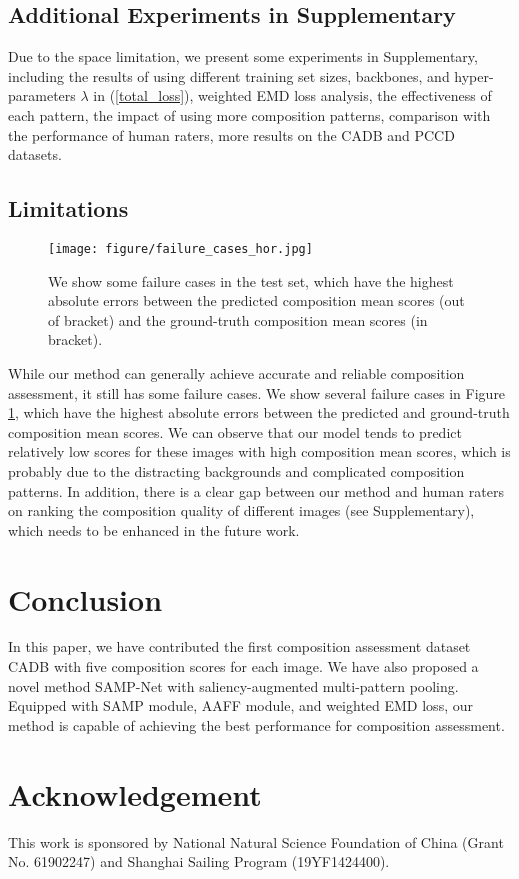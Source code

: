 \documentclass{bmvc2k}
\begin{document}
\subsection{Additional Experiments in Supplementary}
Due to the space limitation, we present some experiments in Supplementary, including the results of using different training set sizes, backbones, and hyper-parameters $\lambda$ in  (\ref{total_loss}), weighted EMD loss analysis, the effectiveness of each pattern, the impact of using more composition patterns, comparison with the performance of human raters, more results on the CADB and PCCD \cite{Chang2017AestheticCG} datasets.
\vspace{-2mm}

\subsection{Limitations}
\label{sec:limitation}
\begin{figure}[tbp]
\begin{center}
  \texttt{[image: figure/failure\_cases\_hor.jpg]}
\end{center}
  \vspace{-6mm}
   \caption{We show some failure cases in the test set,  which have the highest absolute errors between the predicted composition mean scores (out of bracket) and the ground-truth composition mean scores (in bracket). }
  \vspace{-5mm}
\label{fig:failure_cases}
\end{figure}

\textcolor[rgb]{0,0,0}{While our method can generally achieve accurate and reliable composition assessment, it still has some failure cases. We show several failure cases in Figure \ref{fig:failure_cases}, which have the highest absolute errors between the predicted and ground-truth composition mean scores. We can observe that our model tends to predict relatively low scores for these images with high composition mean scores, which is probably due to the distracting backgrounds and complicated composition patterns. 
In addition, there is a clear gap between our method and human raters on ranking the composition quality of different images (see Supplementary), which needs to be enhanced in the  future work.
}
\vspace{-4mm}

\section{Conclusion}
In this paper, we have contributed the first composition assessment dataset CADB with five composition scores for each image. 
We have also proposed a novel method SAMP-Net with saliency-augmented multi-pattern pooling. Equipped with SAMP module, AAFF module, and weighted EMD loss, our method is capable of achieving the best performance for composition assessment.
\vspace{-4mm}
\section*{Acknowledgement}
This work is  sponsored by National Natural Science Foundation of China (Grant No. 61902247) and Shanghai Sailing Program (19YF1424400).


\end{document}
